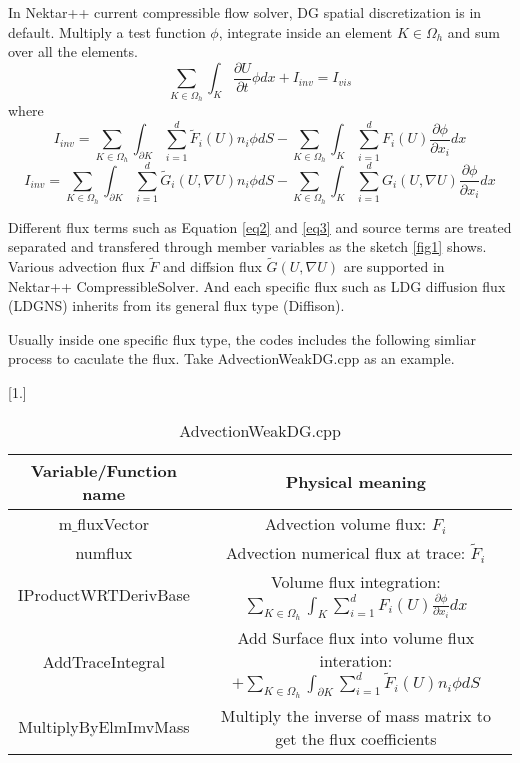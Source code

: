 In Nektar++ current compressible flow solver, DG spatial discretization is in default. Multiply a test function $\phi$, integrate inside an element $K\in \Omega_{h}$ and sum over all the elements.
\begin{equation}
  \sum\limits_{K\in \Omega_{h}}{\int_{K}{\frac{\partial U}{\partial t}\phi dx}}+I_{inv}=I_{vis}
\end{equation}
where
\begin{equation}\label{eq2}
I_{inv}= \sum\limits_{K\in \Omega_{h}}{\int_{\partial K}{\sum\limits_{i=1}^{d}{\widetilde{F}_{i}(U)n_{i}\phi}}dS}-
\sum\limits_{K\in \Omega_{h}}{\int_{K}{\sum\limits_{i=1}^{d}{F_{i}(U)\frac{\partial \phi}{\partial x_{i}}dx}}}
\end{equation}
\begin{equation}\label{eq3}
I_{inv}= \sum\limits_{K\in \Omega_{h}}{\int_{\partial K}{\sum\limits_{i=1}^{d}{\widetilde{G}_{i}(U,\nabla U)n_{i}\phi}}dS}-
\sum\limits_{K\in \Omega_{h}}{\int_{K}{\sum\limits_{i=1}^{d}{G_{i}(U,\nabla U)\frac{\partial \phi}{\partial x_{i}}dx}}}
\end{equation}

Different flux terms such as Equation \eqref{eq2} and \eqref{eq3} and source terms are treated separated and transfered through member variables as the sketch \ref{fig1} shows.
Various advection flux $\widetilde{F}$ and diffsion flux $\widetilde{G}(U,\nabla U)$ are supported in Nektar++ CompressibleSolver. And each specific flux such as LDG diffusion flux (LDGNS) inherits from its general flux type (Diffison).

Usually inside one specific flux type, the codes includes the following simliar process to caculate the flux. Take AdvectionWeakDG.cpp as an example.
\begin {table}[!h]
\caption {AdvectionWeakDG.cpp} \label{table1} 
\begin{center}
\scalebox{0.9}[1.]{
\begin{tabular}{ | c | c|}
  \hline      
Variable/Function name & Physical meaning \\  
  \hline
  m$\_$fluxVector  & Advection volume flux: $F_{i}$\\
  \hline
  numflux  & Advection numerical flux at trace: $\widetilde{F}_{i}$\\
   \hline
  IProductWRTDerivBase &  Volume flux integration: $\sum\limits_{K\in \Omega_{h}}{\int_{K}{\sum\limits_{i=1}^{d}{F_{i}(U)\frac{\partial \phi}{\partial x_{i}}dx}}}$ \\
   \hline
   AddTraceIntegral &  Add Surface flux into volume flux interation: $+\sum\limits_{K\in \Omega_{h}}{\int_{\partial K}{\sum\limits_{i=1}^{d}{\widetilde{F}_{i}(U)n_{i}\phi}}dS}$\\ 
  \hline
  MultiplyByElmImvMass& Multiply the inverse of mass matrix to get the flux coefficients\\
 \hline
\end{tabular}
}
\end{center}
\end{table}
\clearpage
